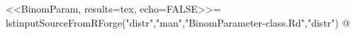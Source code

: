 <<BinomParam, results=tex, echo=FALSE>>=
lstinputSourceFromRForge("distr","man","BinomParameter-class.Rd","distr")
@
